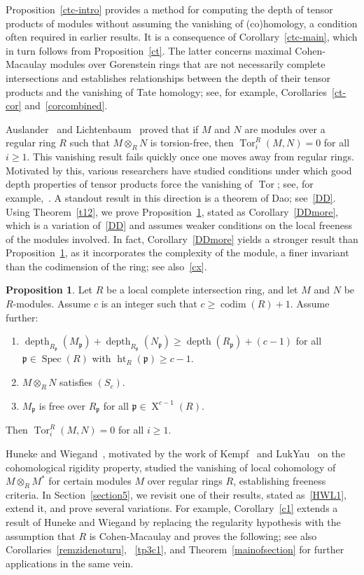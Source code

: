 \documentclass[11pt]{amsart}
\theoremstyle{definition}
\newtheorem{prop}[thm]{Proposition}
\theoremstyle{definition}
\numberwithin{equation}{section}
\newcommand{\fp}{\mathfrak{p}}
\DeclareMathOperator{\X}{X}
\DeclareMathOperator{\depth}{depth}
\DeclareMathOperator{\Ht}{ht}
\DeclareMathOperator{\Spec}{Spec}
\DeclareMathOperator{\Tor}{Tor}
\DeclareMathOperator{\cod}{codim}
\begin{document}
Proposition~\ref{ctc-intro} provides a method for computing the depth of tensor products of modules without assuming the vanishing of (co)homology, a condition often required in earlier results. It is a consequence of Corollary~\ref{ctc-main}, which in turn follows from Proposition~\ref{ct}. The latter concerns maximal Cohen-Macaulay modules over Gorenstein rings that are not necessarily complete intersections and establishes relationships between the depth of their tensor products and the vanishing of Tate homology; see, for example, Corollaries~\ref{ct-cor} and~\ref{corcombined}.

Auslander~\cite{Au} and Lichtenbaum~\cite{Li} proved that if $M$ and $N$ are modules over a regular ring $R$ such that $M \otimes_R N$ is torsion-free, then $\Tor_i^R(M, N) = 0$ for all $i \geq 1$. This vanishing result fails quickly once one moves away from regular rings. Motivated by this, various researchers have studied conditions under which good depth properties of tensor products force the vanishing of $\Tor$; see, for example,~\cite{MA, Ce, CIPW, Da1, HW1, HW2, Jo1}. A standout result in this direction is a theorem of Dao; see~\ref{DD}. Using Theorem~\ref{t12}, we prove Proposition~\ref{DDmore-intro}, stated as Corollary~\ref{DDmore}, which is a variation of~\ref{DD} and assumes weaker conditions on the local freeness of the modules involved. In fact, Corollary~\ref{DDmore} yields a stronger result than Proposition~\ref{DDmore-intro}, as it incorporates the complexity of the module, a finer invariant than the codimension of the ring; see also~\ref{cx}.

\begin{prop} \label{DDmore-intro} Let $R$ be a local complete intersection ring, and let $M$ and $N$ be $R$-modules. Assume $c$ is an integer such that $c \geq  \cod(R)+1$. Assume further:
\begin{enumerate}[\rm(i)]
\item $\depth_{R_\fp}(M_\fp)+\depth_{R_\fp}(N_\fp)\geq \depth(R_\fp)+(c-1)$ for all $\fp \in \Spec(R)$ with $\Ht_R(\fp)\geq c-1$.
\item $M\otimes_RN$ satisfies $(S_{c})$.
\item $M_{\fp}$ is free over $R_{\fp}$ for all $\fp \in \X^{c-1}(R)$. 
\end{enumerate}
Then $\Tor_{i}^R(M,N)=0$ for all $i\geq 1$.
\end{prop}

Huneke and Wiegand~\cite{HW2}, motivated by the work of Kempf~\cite{Kem} and Luk\textendash Yau~\cite{Luk} on the cohomological rigidity property, studied the vanishing of local cohomology of $M \otimes_R M^{\ast}$ for certain modules $M$ over regular rings $R$, establishing freeness criteria. In Section~\ref{section5}, we revisit one of their results, stated as~\ref{HWL1}, extend it, and prove several variations. For example, Corollary~\ref{c1} extends a result of Huneke and Wiegand by replacing the regularity hypothesis with the assumption that $R$ is Cohen-Macaulay and proves the following; see also Corollaries~\ref{remzidenoturu}, ~\ref{tp3c1}, and Theorem~\ref{mainofsection} for further applications in the same vein.
\end{document}
